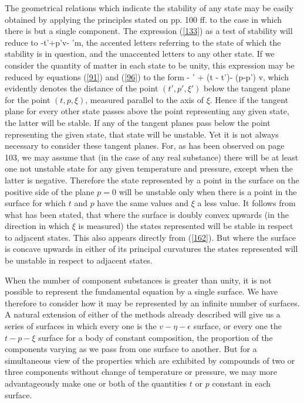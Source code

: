 \documentclass[12pt]{article}
\begin{document}
The geometrical relations which indicate the stability of any state may be easily obtained by applying the principles stated on pp. 100 ff. to the case in which there is but a single component. The expression (\ref{133}) as a test of stability will reduce to
\eqs \epsilon-t'\eta+p'v- \mu'm, \label{197}\eqe
the accented letters referring to the state of which the stability is in question, and the unaccented letters to any other state. If we consider the quantity of matter in each state to be unity, this expression may be reduced by equations (\ref{91}) and (\ref{96}) to the form
\eqs \xi- \xi' + (t - t')\eta - (p-p') v, \label{198}\eqe
which evidently denotes the distance of the point $(t', p', \xi')$ below the tangent plane for the point $(t, p, \xi)$, measured parallel to the axis of $\xi$. Hence if the tangent plane for every other state passes above the point representing any given state, the latter will be stable. If any of the tangent planes pass below the point representing the given state, that state will be unstable. Yet it is not always necessary to consider these tangent planes. For, as has been observed on page 103, we may assume that (in the case of any real substance) there will be at least one not unstable state for any given temperature and pressure, except when the latter is negative. Therefore the state represented by a point in the surface on the positive side of the plane $p =0$ will be unstable only when there is a point in the surface for which $t$ and $p$ have the same values and $\xi$ a less value. It follows from what has been stated, that where the surface is doubly convex upwards (in the direction in which $\xi$ is measured) the states represented will be stable in respect to adjacent states. This also appears directly from (\ref{162}). But where the surface is concave upwards in either of its principal curvatures the states represented will be unstable in respect to adjacent states.


When the number of component substances is greater than unity, it is not possible to represent the fundamental equation by a single surface. We have therefore to consider how it may be represented by an infinite number of surfaces. A natural extension of either of the methods already described will give us a series of surfaces in which every one is the $v\!- \eta\!-\epsilon$ surface, or every one the $t\!-p\!-\xi$ surface for a body of constant composition, the proportion of the components varying as we pass from one surface to another. But for a simultaneous view of the properties which are exhibited by compounds of two or three components without change of temperature or pressure, we may more advantageously make one or both of the quantities $t$ or $p$ constant in each surface.
\end{document}
